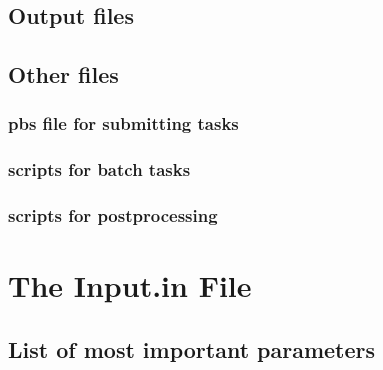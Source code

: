 \documentclass{article}
\begin{document}
\subsection{Output files}
\subsection{Other files}
\subsubsection{pbs file for submitting tasks}
\subsubsection{scripts for batch tasks}
\subsubsection{scripts for postprocessing}

\section{The Input.in File}

\subsection{List of most important parameters}

\end{document}
